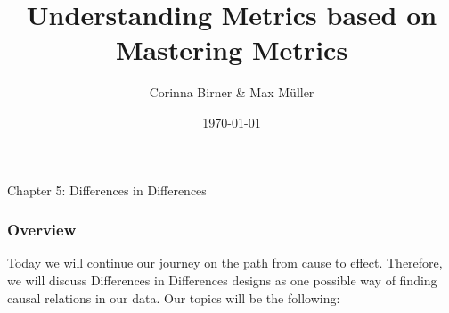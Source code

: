 \documentclass{beamer}
\title[Mastering Metrics]{Understanding Metrics based on Mastering Metrics } %
\author{Corinna Birner \& Max M{\"u}ller} %
\institute[JMU] %
{University of W{\"u}rzburg }\\ %
\date{\today} %
\begin{document}
\begin{frame}
\titlepage %
\end{frame}

\begin{frame}
\begin{center}
\textbf\Huge{Chapter 5: Differences in Differences}
\end{center}
\end{frame}

\begin{frame}
\frametitle{Overview} %
Today we will continue our journey on the path from cause to effect. Therefore, we will discuss Differences in Differences designs as one possible way of finding causal relations in our data. Our topics will be the following:

\tableofcontents %
\end{frame}

\end{document}
